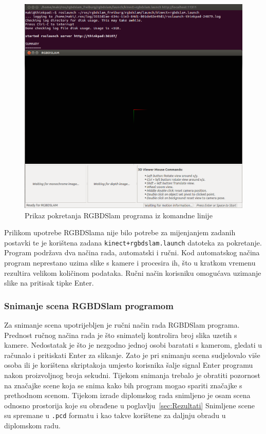 \setcounter{figure}{0}
\begin{figure}[h]
\centering
\includegraphics[scale=0.39]{figures/running-rgbdslam.png}
\caption{Prikaz pokretanja RGBDSlam programa iz komandne linije}
\label{fig:running-rgbdslam}
\end{figure}

Prilikom upotrebe RGBDSlama nije bilo potrebe za mijenjanjem zadanih
postavki te je korištena zadana \texttt{kinect+rgbdslam.launch}
datoteka za pokretanje. Program podržava dva načina rada, automatski i
ručni. Kod automatskog načina program neprestano uzima slike s kamere i
procesira ih, što u kratkom vremenu rezultira velikom količinom
podataka. Ručni način korisniku omogućava uzimanje slike na pritisak
tipke Enter.


\newpage
\subsubsection{Snimanje scena RGBDSlam programom} %
\label{ssub:Snimanje scena RGBDSlam programom}

Za snimanje scena upotrijebljen je ručni način rada RGBDSlam programa.
Prednost ručnog načina rada je što snimatelj kontrolira broj slika
uzetih s kamere. Nedostatak je što je nezgodno jednoj osobi baratati s
kamerom, gledati u računalo i pritiskati Enter za slikanje. Zato je pri
snimanju scena sudjelovalo više osoba ili je korištena
skripta\footnotemark[1] koja umjesto korisnika šalje signal Enter
programu nakon proizvoljnog broja sekudni. Tijekom snimanja trebalo je
obratiti pozornost na značajke scene koja se snima kako bih program
mogao spariti značajke s prethodnom scenom. Tijekom izrade diplomskog
rada snimljeno je osam scena odnosno prostorija koje su obrađene u
poglavlju~\ref{sec:Rezultati} Snimljene scene su spremane u
\texttt{.pcd} formatu i kao takve korištene za daljnju obradu u
diplomskom radu.

